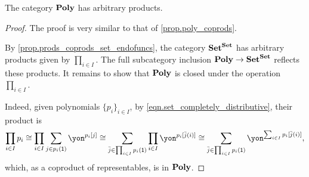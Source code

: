 \documentclass[Book-Poly]{subfiles}
\begin{document}
\begin{proposition}\label{prop.poly_prods}
The category $\mathbf{Poly}$ has arbitrary products. 
\end{proposition}
\begin{proof}
The proof is very similar to that of \cref{prop.poly_coprods}.

By \cref{prop.prods_coprods_set_endofuncs}, the category $\mathbf{Set}^{\mathbf{Set}}$ has arbitrary products given by $\prod_{i \in I}$.
The full subcategory inclusion $\mathbf{Poly} \to \mathbf{Set}^{\mathbf{Set}}$ reflects these products.
It remains to show that $\mathbf{Poly}$ is closed under the operation $\prod_{i \in I}$.

Indeed, given polynomials $\{p_i\}_{i \in I}$, by \eqref{eqn.set_completely_distributive}, their product is
\begin{equation} \label{eqn.poly_prod}
    \prod_{i \in I} p_i \iso \prod_{i \in I} \sum_{j \in p_i(\1)} \yon^{p_i[j]} \iso \sum_{\bar{j} \in \prod_{i \in I} p_i(\1)} \prod_{i \in I} \yon^{p_i[\bar{j}(i)]} \iso \sum_{\bar{j} \in \prod_{i \in I} p_i(\1)} \yon^{\sum_{i \in I} p_i[\bar{j}(i)]},
\end{equation}
which, as a coproduct of representables, is in $\mathbf{Poly}$.
\end{proof}
\end{document}
